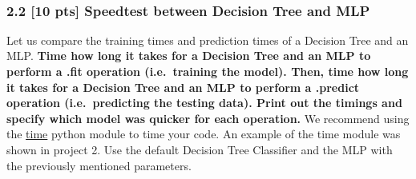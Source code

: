\documentclass[11pt]{article}
\begin{document}
    \begin{center}
    \end{center}
    { \hspace*{\fill} \\}
    
    \hypertarget{pts-speedtest-between-decision-tree-and-mlp}{%
\subsubsection{2.2 {[}10 pts{]} Speedtest between Decision Tree and
MLP}\label{pts-speedtest-between-decision-tree-and-mlp}}

Let us compare the training times and prediction times of a Decision
Tree and an MLP. \textbf{Time how long it takes for a Decision Tree and
an MLP to perform a .fit operation (i.e.~training the model). Then, time
how long it takes for a Decision Tree and an MLP to perform a .predict
operation (i.e.~predicting the testing data). Print out the timings and
specify which model was quicker for each operation.} We recommend using
the \href{https://docs.python.org/3/library/time.html}{time} python
module to time your code. An example of the time module was shown in
project 2. Use the default Decision Tree Classifier and the MLP with the
previously mentioned parameters.
\end{document}
